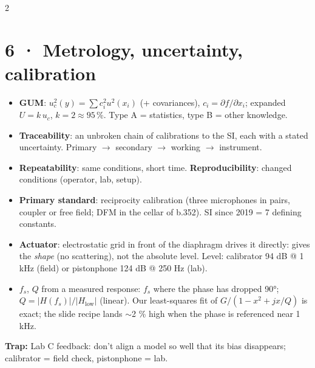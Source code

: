\documentclass[8pt]{extarticle}
\newcommand{\trap}[1]{\par{\color{tr}\bfseries Trap:} #1\par}
\begin{document}
\begin{multicols}{2}
\section{6 · Metrology, uncertainty, calibration}
\begin{itemize}
\item \textbf{GUM}: $u_c^2(y)=\sum c_i^2u^2(x_i)$ (+ covariances), $c_i=\partial f/\partial x_i$; expanded $U=k\,u_c$, $k=2\approx95$\,\%. Type A = statistics, type B = other knowledge.
\item \textbf{Traceability}: an unbroken chain of calibrations to the SI, each with a stated uncertainty. Primary $\to$ secondary $\to$ working $\to$ instrument.
\item \textbf{Repeatability}: same conditions, short time. \textbf{Reproducibility}: changed conditions (operator, lab, setup).
\item \textbf{Primary standard}: reciprocity calibration (three microphones in pairs, coupler or free field; DFM in the cellar of b.352). SI since 2019 = 7 defining constants.
\item \textbf{Actuator}: electrostatic grid in front of the diaphragm drives it directly: gives the \emph{shape} (no scattering), not the absolute level. Level: calibrator 94 dB @ 1 kHz (field) or pistonphone 124 dB @ 250 Hz (lab).
\item $f_s$, $Q$ from a measured response: $f_s$ where the phase has dropped 90°; $Q=|H(f_s)|/|H_{\text{low}}|$ (linear). Our least-squares fit of $G/(1-x^2+jx/Q)$ is exact; the slide recipe lands $\sim$2 \% high when the phase is referenced near 1 kHz.
\end{itemize}
\trap{Lab C feedback: don't align a model so well that its bias disappears; calibrator = field check, pistonphone = lab.}


\end{multicols}
\end{document}
